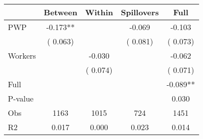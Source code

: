 
\begin{tabular}{l*{4}{c}}\hline&\multicolumn{1}{c}{Between}&\multicolumn{1}{c}{Within}&\multicolumn{1}{c}{Spillovers}&\multicolumn{1}{c}{Full}\\ \hline
 PWP           &             -0.173**      &                                               &       -0.069 &        -0.103                            \\ 
                               &        (       0.063)           &                                       &       (       0.081)     &      (       0.073)                                           \\ 
 Workers       &                                               &       -0.030    &                                &            -0.062                            \\ 
                               &                                               & (       0.074)                  &                                        &      (       0.071)                                           \\ 
\hline                                                                                                                                                                                                                                            
 Full                  &                                               &                                               &                                        &            -0.089**                                     \\ 
 P-value               &                                               &                                               &                                        &             0.030                                           \\ 
 Obs                   &               1163               &       1015                       &       724                &              1451                                               \\ 
 R2                    &                      0.017              &              0.000                      &              0.023               &                     0.014                                              \\ 
\hline \end{tabular}                                                                                                                                                                                                              